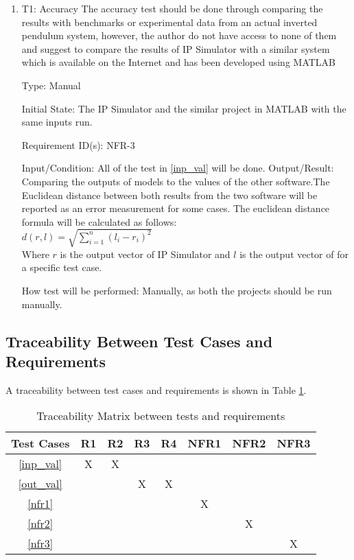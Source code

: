 \documentclass[12pt, titlepage]{article}
\begin{document}
\begin{enumerate}

\item{T1: Accuracy}
\vspace{3mm}
\newline
The accuracy test should be done through comparing the results with benchmarks or experimental data from an actual inverted pendulum system, however, the author do not have access to none of them and suggest to compare the results of IP Simulator with a similar system which is available on the Internet and has been developed using MATLAB \cite{al-khazraji_2022} 

Type: Manual
					
Initial State: The IP Simulator and the similar project in MATLAB with the same inputs run.

Requirement ID(s): NFR-3			

Input/Condition: All of the test in \ref{inp_val} will be done.  		
Output/Result: Comparing the outputs of models to the values of the other software.The Euclidean distance between both results from the two software will be reported as an error measurement for some cases. The euclidean distance formula will be calculated as follows:\\
\newline
$d\left( r,l\right)   = \sqrt {\sum _{i=1}^{n}  \left( l_{i}-r_{i}\right)^2 } $ \\
\newline
Where $r$ is the output vector of IP Simulator and $l$ is the output vector of \cite{al-khazraji_2022} for a specific test case. 

How test will be performed: Manually, as both the projects should be run manually.

\end{enumerate}

\subsection{Traceability Between Test Cases and Requirements}
A traceability between test cases and requirements is shown in Table \ref{tbl_rel}.


\begin{table} [h!]
\caption{Traceability Matrix between tests and requirements}\label{tbl_rel}
\vspace*{3mm}
\centering
\begin{tabular}{|c|c| c| c| c | c|c | c|}
\hline
Test Cases & R1 & R2 & R3& R4& NFR1& NFR2&NFR3  \\
 \hline   
 \ref{inp_val} &X &X & & &&& \\
 \hline
  \ref{out_val}   & & & X&X & && \\
 \hline
  \ref{nfr1}   && & & &  X&&\\
 \hline
  \ref{nfr2}  &&& & &  &X&\\
 \hline
  \ref{nfr3}  &&& & &  &&X\\
 \hline
\end{tabular}

\end{table}
\end{document}
